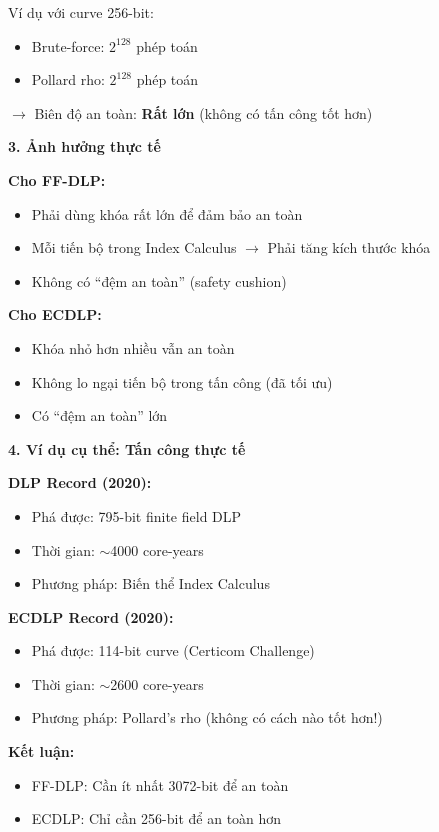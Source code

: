Ví dụ với curve 256-bit:
\begin{itemize}
    \item Brute-force: $2^{128}$ phép toán
    \item Pollard rho: $2^{128}$ phép toán
\end{itemize}

$\rightarrow$ Biên độ an toàn: \textbf{Rất lớn} (không có tấn công tốt hơn)

\textbf{3. Ảnh hưởng thực tế}

\textbf{Cho FF-DLP:}
\begin{itemize}
    \item Phải dùng khóa rất lớn để đảm bảo an toàn
    \item Mỗi tiến bộ trong Index Calculus $\rightarrow$ Phải tăng kích thước khóa
    \item Không có ``đệm an toàn'' (safety cushion)
\end{itemize}

\textbf{Cho ECDLP:}
\begin{itemize}
    \item Khóa nhỏ hơn nhiều vẫn an toàn
    \item Không lo ngại tiến bộ trong tấn công (đã tối ưu)
    \item Có ``đệm an toàn'' lớn
\end{itemize}

\textbf{4. Ví dụ cụ thể: Tấn công thực tế}

\textbf{DLP Record (2020):}
\begin{itemize}
    \item Phá được: 795-bit finite field DLP
    \item Thời gian: $\sim$4000 core-years
    \item Phương pháp: Biến thể Index Calculus
\end{itemize}

\textbf{ECDLP Record (2020):}
\begin{itemize}
    \item Phá được: 114-bit curve (Certicom Challenge)
    \item Thời gian: $\sim$2600 core-years
    \item Phương pháp: Pollard's rho (không có cách nào tốt hơn!)
\end{itemize}

\textbf{Kết luận:}
\begin{itemize}
    \item FF-DLP: Cần ít nhất 3072-bit để an toàn
    \item ECDLP: Chỉ cần 256-bit để an toàn hơn
\end{itemize}

